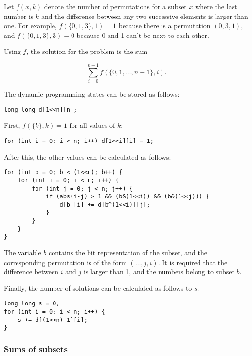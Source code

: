 Let $f(x,k)$ denote the number of permutations
for a subset $x$
where the last number is $k$ and
the difference between any two successive
elements is larger than one.
For example, $f(\{0,1,3\},1)=1$
because there is a permutation $(0,3,1)$,
and $f(\{0,1,3\},3)=0$ because 0 and 1
can't be next to each other.

Using $f$, the solution for the problem is the sum

\[ \sum_{i=0}^{n-1} f(\{0,1,\ldots,n-1\},i). \]

\noindent
The dynamic programming states can be stored as follows:

\begin{lstlisting}
long long d[1<<n][n];
\end{lstlisting}

\noindent
First, $f(\{k\},k)=1$ for all values of $k$:

\begin{lstlisting}
for (int i = 0; i < n; i++) d[1<<i][i] = 1;
\end{lstlisting}

\noindent
After this, the other values can be calculated
as follows:

\begin{lstlisting}
for (int b = 0; b < (1<<n); b++) {
    for (int i = 0; i < n; i++) {
        for (int j = 0; j < n; j++) {
            if (abs(i-j) > 1 && (b&(1<<i)) && (b&(1<<j))) {
                d[b][i] += d[b^(1<<i)][j];
            }
        }
    }
}
\end{lstlisting}

\noindent
The variable $b$ contains the bit representation
of the subset, and the corresponding
permutation is of the form $(\ldots,j,i)$.
It is required that the difference between
$i$ and $j$ is larger than 1, and the
numbers belong to subset $b$.

Finally, the number of solutions can be
calculated as follows to $s$:

\begin{lstlisting}
long long s = 0;
for (int i = 0; i < n; i++) {
    s += d[(1<<n)-1][i];
}
\end{lstlisting}

\subsubsection{Sums of subsets}

